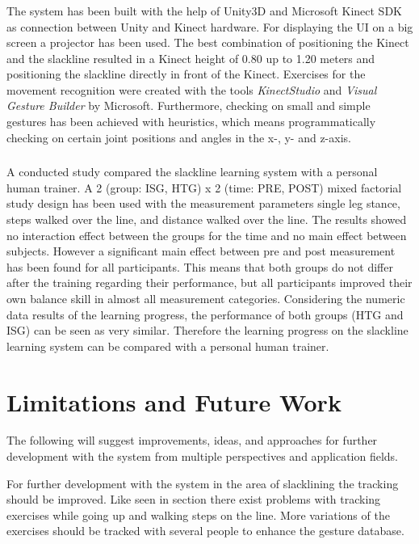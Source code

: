 \subsubsection{}
The system has been built with the help of Unity3D and Microsoft Kinect SDK as connection between Unity and Kinect hardware.
For displaying the UI on a  big screen a projector has been used.
The best combination of positioning the Kinect and the slackline resulted in a Kinect height of 0.80 up to 1.20 meters and positioning the slackline directly in front of the Kinect.
Exercises for the movement recognition were created with the tools \textit{KinectStudio} and \textit{Visual Gesture Builder} by Microsoft.
Furthermore, checking on small and simple gestures has been achieved with heuristics, which means programmatically checking on certain joint positions and angles in the x-, y- and z-axis.

\subsubsection{}
A conducted study compared the slackline learning system with a personal human trainer.
A 2 (group: ISG, HTG) x 2 (time: PRE, POST) mixed factorial study design has been used with the measurement parameters single leg stance, steps walked over the line, and distance walked over the line.
The results showed no interaction effect between the groups for the time and no main effect between subjects.
However a significant main effect between pre and post measurement has been found for all participants.
This means that both groups do not differ after the training regarding their performance, but all participants improved their own balance skill in almost all measurement categories.
Considering the numeric data results of the learning progress, the performance of both groups (HTG and ISG) can be seen as very similar.
Therefore the learning progress on the slackline learning system can be compared with a personal human trainer.

\section{Limitations and Future Work}
The following will suggest improvements, ideas, and approaches for further development with the system from multiple perspectives and application fields.

For further development with the system in the area of slacklining the tracking should be improved.
Like seen in section \textit{} there exist problems with tracking exercises while going up and walking steps on the line.
More variations of the exercises should be tracked with several people to enhance the gesture database.

